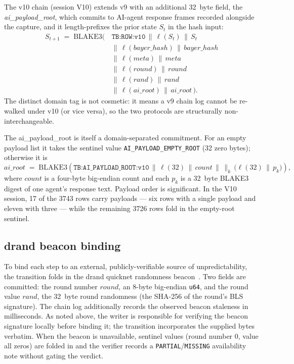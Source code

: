 The v10 chain (session V10) extends v9 with an additional \SI{32}{byte} field, the \emph{ai\_payload\_root}, which commits to AI-agent response frames recorded alongside the capture, and it length-prefixes the prior state $S_t$ in the hash input:
\begin{equation}
\begin{aligned}
S_{t+1} \;=\; \mathrm{BLAKE3}\big(\,&\texttt{TB:ROW:v10}\,\|\,\ell(S_t)\,\|\,S_t\\
&\|\,\ell(\mathit{bayer\_hash})\,\|\,\mathit{bayer\_hash}\\
&\|\,\ell(\mathit{meta})\,\|\,\mathit{meta}\\
&\|\,\ell(\mathit{round})\,\|\,\mathit{round}\\
&\|\,\ell(\mathit{rand})\,\|\,\mathit{rand}\\
&\|\,\ell(\mathit{ai\_root})\,\|\,\mathit{ai\_root}\,\big).
\end{aligned}
\label{eq:pc_v10}
\end{equation}
The distinct domain tag is not cosmetic: it means a v9 chain log cannot be re-walked under v10 (or vice versa), so the two protocols are structurally non-interchangeable.

The ai\_payload\_root is itself a domain-separated commitment. For an empty payload list it takes the sentinel value \texttt{AI\_PAYLOAD\_EMPTY\_ROOT} (32 zero bytes); otherwise it is
\begin{equation}
\mathit{ai\_root} \;=\; \mathrm{BLAKE3}\!\left(\texttt{TB:AI\_PAYLOAD\_ROOT:v10}\,\|\,\ell(32)\,\|\,\mathit{count}\,\|\,{\textstyle\bigl\|}_{k}\,\bigl(\ell(32)\,\|\,p_k\bigr)\right),
\label{eq:pc_airoot}
\end{equation}
where $\mathit{count}$ is a four-byte big-endian count and each $p_k$ is a \SI{32}{byte} BLAKE3 digest of one agent's response text. Payload order is significant. In the V10 session, \num{17} of the \num{3743} rows carry payloads --- six rows with a single payload and eleven with three --- while the remaining \num{3726} rows fold in the empty-root sentinel.

\subsection{drand beacon binding}
\label{subsec:pc_drand}

To bind each step to an external, publicly-verifiable source of unpredictability, the transition folds in the drand quicknet randomness beacon~\cite{drandbeacon}. Two fields are committed: the round number $\mathit{round}$, an 8-byte big-endian \texttt{u64}, and the round value $\mathit{rand}$, the \SI{32}{byte} round randomness (the SHA-256 of the round's BLS signature). The chain log additionally records the observed beacon staleness in milliseconds. As noted above, the writer is responsible for verifying the beacon signature locally before binding it; the transition incorporates the supplied bytes verbatim. When the beacon is unavailable, sentinel values (round number $0$, value all zeros) are folded in and the verifier records a \texttt{PARTIAL}/\texttt{MISSING} availability note without gating the verdict.


